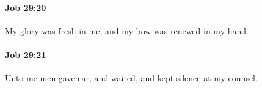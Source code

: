 		\paragraph{Job 29:20} %
			\label{JOB-29-20}

			My glory was fresh in me, and my bow was renewed in my hand.


		\paragraph{Job 29:21} %
			\label{JOB-29-21}

			Unto me men gave ear, and waited, and kept silence at my counsel.


